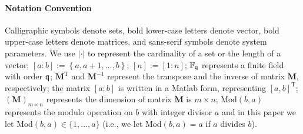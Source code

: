 \documentclass[conference,letterpaper]{IEEEtran}
\begin{document}
\paragraph*{Notation Convention}
Calligraphic symbols denote sets,  
bold lower-case letters denote vector, bold
upper-case letters denote matrices,
and sans-serif symbols denote system parameters.
We use $|\cdot|$ to represent the cardinality of a set or the length of a vector;
$[a:b]:=\left\{ a,a+1,\ldots,b\right\}$; %
  $[n] := [1:n]$;
$\mathbb{F}_{{\sf q}}$ represents a  finite field with order ${\sf q}$;         
$\mathbf{M}^{\text{T}}$  and $\mathbf{M}^{-1}$ represent the transpose  and the inverse of matrix $\mathbf{M}$, respectively;
 the matrix $[a;b]$ is written in a Matlab form, representing $[a,b]^{\text{T}}$;
$(\mathbf{M})_{m \times n}$ represents the dimension of matrix $\mathbf{M}$ is $m \times n$;
 $\text{Mod} (b,a)$ represents the modulo operation on $b$ with  integer divisor $a$ and in this paper we let $\text{Mod}(b,a)\in \{1,\ldots,a \}$ (i.e., we let $ \text{Mod}(b,a)=a$ if $a$ divides $b$).
\end{document}
